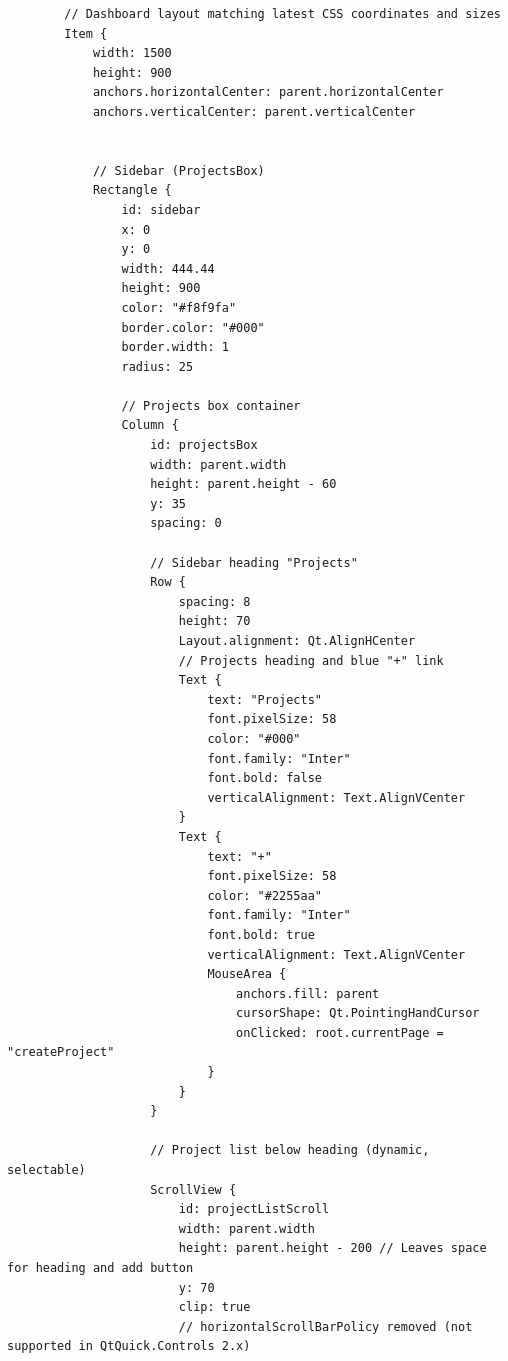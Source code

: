 \documentclass{report}
\begin{document}
\begin{lstlisting}
        // Dashboard layout matching latest CSS coordinates and sizes
        Item {
            width: 1500
            height: 900
            anchors.horizontalCenter: parent.horizontalCenter
            anchors.verticalCenter: parent.verticalCenter


            // Sidebar (ProjectsBox)
            Rectangle {
                id: sidebar
                x: 0
                y: 0
                width: 444.44
                height: 900
                color: "#f8f9fa"
                border.color: "#000"
                border.width: 1
                radius: 25

                // Projects box container
                Column {
                    id: projectsBox
                    width: parent.width
                    height: parent.height - 60
                    y: 35
                    spacing: 0

                    // Sidebar heading "Projects"
                    Row {
                        spacing: 8
                        height: 70
                        Layout.alignment: Qt.AlignHCenter
                        // Projects heading and blue "+" link
                        Text {
                            text: "Projects"
                            font.pixelSize: 58
                            color: "#000"
                            font.family: "Inter"
                            font.bold: false
                            verticalAlignment: Text.AlignVCenter
                        }
                        Text {
                            text: "+"
                            font.pixelSize: 58
                            color: "#2255aa"
                            font.family: "Inter"
                            font.bold: true
                            verticalAlignment: Text.AlignVCenter
                            MouseArea {
                                anchors.fill: parent
                                cursorShape: Qt.PointingHandCursor
                                onClicked: root.currentPage = "createProject"
                            }
                        }
                    }

                    // Project list below heading (dynamic, selectable)
                    ScrollView {
                        id: projectListScroll
                        width: parent.width
                        height: parent.height - 200 // Leaves space for heading and add button
                        y: 70
                        clip: true
                        // horizontalScrollBarPolicy removed (not supported in QtQuick.Controls 2.x)


\end{lstlisting}
\end{document}
